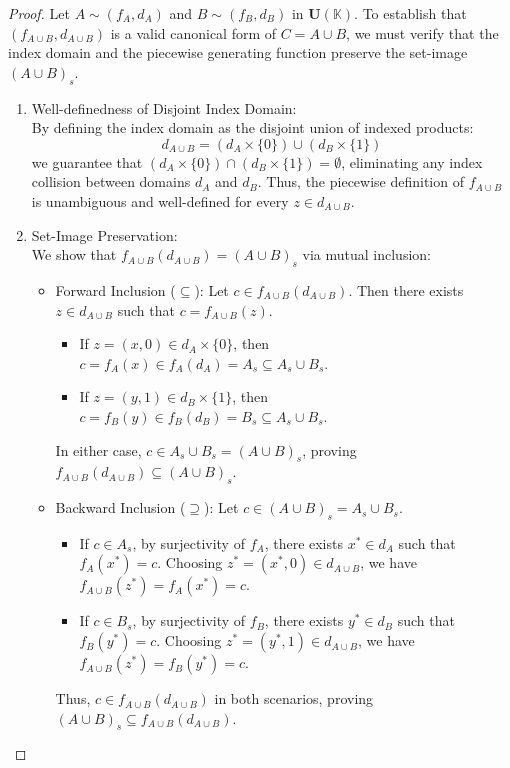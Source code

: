 \documentclass[a4paper,12pt, twoside]{memoir}
\begin{document}
\begin{proof}
	Let $A \sim (f_A, d_A)$ and $B \sim (f_B, d_B)$ in $\mathbf{U}(\mathbb{K})$. To establish that $(f_{A \cup B}, d_{A \cup B})$ is a valid canonical form of $C = A \cup B$, we must verify that the index domain and the piecewise generating function preserve the set-image $(A \cup B)_s$.

	\begin{enumerate}[leftmargin=*]
		\item Well-definedness of Disjoint Index Domain: \\
		      By defining the index domain as the disjoint union of indexed products:
		      \[
			      d_{A \cup B} = (d_A \times \{0\}) \cup (d_B \times \{1\})
		      \]
		      we guarantee that $(d_A \times \{0\}) \cap (d_B \times \{1\}) = \emptyset$, eliminating any index collision between domains $d_A$ and $d_B$. Thus, the piecewise definition of $f_{A \cup B}$ is unambiguous and well-defined for every $z \in d_{A \cup B}$.

		\item Set-Image Preservation: \\
		      We show that $f_{A \cup B}(d_{A \cup B}) = (A \cup B)_s$ via mutual inclusion:
		      \begin{itemize}[leftmargin=*]
			      \item Forward Inclusion ($\subseteq$):
			            Let $c \in f_{A \cup B}(d_{A \cup B})$. Then there exists $z \in d_{A \cup B}$ such that $c = f_{A \cup B}(z)$.
			            \begin{itemize}
				            \item If $z = (x, 0) \in d_A \times \{0\}$, then $c = f_A(x) \in f_A(d_A) = A_s \subseteq A_s \cup B_s$.
				            \item If $z = (y, 1) \in d_B \times \{1\}$, then $c = f_B(y) \in f_B(d_B) = B_s \subseteq A_s \cup B_s$.
			            \end{itemize}
			            In either case, $c \in A_s \cup B_s = (A \cup B)_s$, proving $f_{A \cup B}(d_{A \cup B}) \subseteq (A \cup B)_s$.

			      \item Backward Inclusion ($\supseteq$):
			            Let $c \in (A \cup B)_s = A_s \cup B_s$.
			            \begin{itemize}
				            \item If $c \in A_s$, by surjectivity of $f_A$, there exists $x^* \in d_A$ such that $f_A(x^*) = c$. Choosing $z^* = (x^*, 0) \in d_{A \cup B}$, we have $f_{A \cup B}(z^*) = f_A(x^*) = c$.
				            \item If $c \in B_s$, by surjectivity of $f_B$, there exists $y^* \in d_B$ such that $f_B(y^*) = c$. Choosing $z^* = (y^*, 1) \in d_{A \cup B}$, we have $f_{A \cup B}(z^*) = f_B(y^*) = c$.
			            \end{itemize}
			            Thus, $c \in f_{A \cup B}(d_{A \cup B})$ in both scenarios, proving $(A \cup B)_s \subseteq f_{A \cup B}(d_{A \cup B})$.
		      \end{itemize}
	\end{enumerate}


\end{proof}
\end{document}

